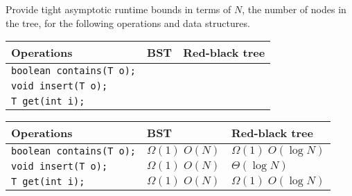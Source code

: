 \question Provide tight asymptotic runtime bounds in terms of $N$, the number of nodes in the tree, for the following operations and data structures.

\ifprintanswers\else
{
\renewcommand{\arraystretch}{2}
\setlength{\tabcolsep}{16pt}
\begin{tabularx}{\textwidth}{Xp{1in}p{1in}}
Operations                      & BST & Red-black tree \\\hline
\texttt{boolean contains(T o);} &     &                \\
\texttt{void insert(T o);}      &     &                \\
\texttt{T get(int i);}          &     &
\end{tabularx}
}
\fi

\begin{solution}
{
\renewcommand{\arraystretch}{2}
\setlength{\tabcolsep}{16pt}
\begin{tabularx}{\textwidth}{Xll}
Operations                      & BST               & Red-black tree         \\\hline
\texttt{boolean contains(T o);} & $\Omega(1)\; O(N)$ & $\Omega(1)\; O(\log N)$ \\
\texttt{void insert(T o);}      & $\Omega(1)\; O(N)$ & $\Theta(\log N)$       \\
\texttt{T get(int i);}          & $\Omega(1)\; O(N)$ & $\Omega(1)\; O(\log N)$
\end{tabularx}
}
\end{solution}